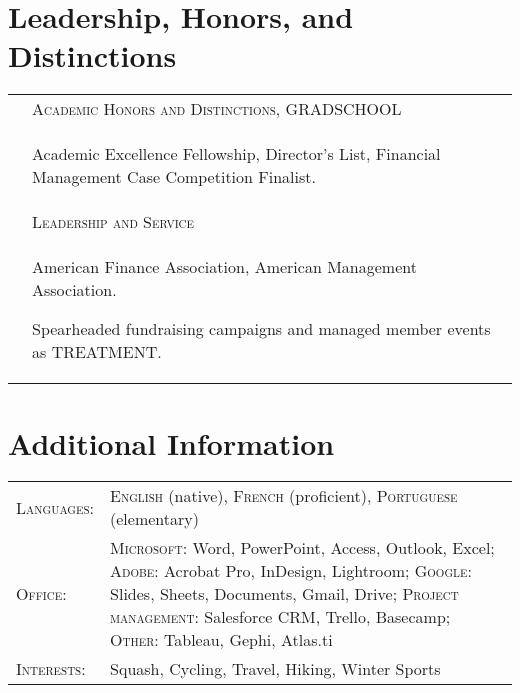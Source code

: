 \documentclass[a4paper,10pt]{article}
\begin{document}
\section{Leadership, Honors, and Distinctions}
\begin{supertabular}{p{3.4cm} p{13.9cm}}

	\textsc{}		 				& \textsc{Academic Honors and Distinctions}, GRADSCHOOL \\
														& \begin{enumerate*}[label =$\diamond$, itemjoin={\newline}]
																\item \footnotesize Academic Excellence Fellowship, Director's List, Financial Management Case Competition Finalist.
																\end{enumerate*} \vspace{2mm} \\

	\textsc{} 						& \textsc{Leadership and Service} \\
														& \begin{enumerate*}[label =$\diamond$, itemjoin={\newline}]
																\item \footnotesize American Finance Association, American Management Association.
																\item \footnotesize  Spearheaded fundraising campaigns and managed member events as TREATMENT.
																\end{enumerate*} \vspace{2mm} \\



\end{supertabular}



\section{Additional Information}
\begin{supertabular}{p{3.4cm} p{13.9cm}}
	\textsc{Languages:}			& \small\textsc{English} (native), \textsc{French} (proficient), \textsc{Portuguese} (elementary) \vspace{1mm} \\

	\textsc{Office:}					& \small\textsc{Microsoft}: \footnotesize Word, PowerPoint, Access, Outlook, Excel;	\small\textsc{Adobe}: \footnotesize Acrobat Pro, InDesign, Lightroom; \small\textsc{Google}: \footnotesize Slides, Sheets, Documents, Gmail, Drive; \small\textsc{Project management:} \footnotesize Salesforce CRM, Trello, Basecamp; \small\textsc{Other:} \footnotesize Tableau, Gephi, Atlas.ti \vspace{1mm} \\
	\textsc{Interests:} 		& \small Squash, Cycling, Travel, Hiking, Winter Sports \\

\end{supertabular}
\end{document}
